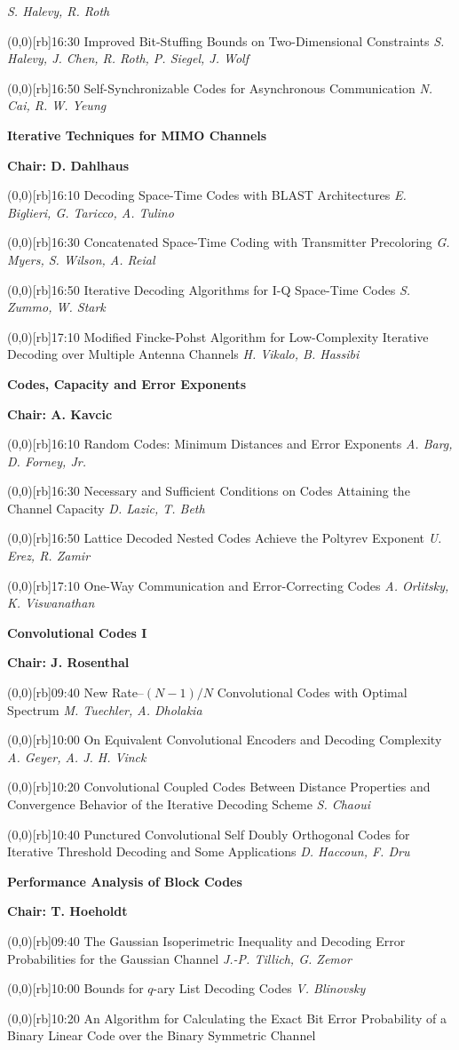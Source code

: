 \documentclass[a5paper,twoside]{article}
\def\period#1{\flushleft{\large\bfseries #1}\markboth{\sf #1}{\sf #1}}
\def\sesstitle#1{\vspace{.45\bigskipamount}\par{\bfseries #1}\par}
\def\sesschair#1{{\bfseries Chair: #1}\par\vspace{.65\medskipamount}}
\def\papertime#1{\makebox(0,0)[rb]{{\scriptsize #1}\hspace{.5em}}}
\def\papertitle#1{#1\hfil\break}
\def\paperauthors#1{{\itshape #1}\par\filbreak\vspace{.65\medskipamount}}
\begin{document}
\paperauthors{S. Halevy, R. Roth}
\papertime{16:30}%
\papertitle{Improved Bit-Stuffing Bounds on Two-Dimensional Constraints}
\paperauthors{S. Halevy, J. Chen, R. Roth, P. Siegel, J. Wolf}
\papertime{16:50}%
\papertitle{Self-Synchronizable Codes for Asynchronous Communication}
\paperauthors{N. Cai, R. W. Yeung}
\sesstitle{Iterative Techniques for MIMO Channels}
\sesschair{D. Dahlhaus}
\papertime{16:10}%
\papertitle{Decoding Space-Time Codes with BLAST Architectures}
\paperauthors{E. Biglieri, G. Taricco, A. Tulino}
\papertime{16:30}%
\papertitle{Concatenated Space-Time Coding with Transmitter Precoloring}
\paperauthors{G. Myers, S. Wilson, A. Reial}
\papertime{16:50}%
\papertitle{Iterative Decoding Algorithms for I-Q Space-Time Codes}
\paperauthors{S. Zummo, W. Stark}
\papertime{17:10}%
\papertitle{Modified Fincke-Pohst Algorithm for Low-Complexity Iterative Decoding over Multiple Antenna Channels}
\paperauthors{H. Vikalo, B. Hassibi}
\sesstitle{Codes, Capacity and Error Exponents}
\sesschair{A. Kavcic}
\papertime{16:10}%
\papertitle{Random Codes: Minimum Distances and Error Exponents}
\paperauthors{A. Barg, D. Forney, Jr.}
\papertime{16:30}%
\papertitle{Necessary and Sufficient Conditions on Codes Attaining the Channel Capacity}
\paperauthors{D. Lazic, T. Beth}
\papertime{16:50}%
\papertitle{Lattice Decoded Nested Codes Achieve the Poltyrev Exponent}
\paperauthors{U. Erez, R. Zamir}
\papertime{17:10}%
\papertitle{One-Way Communication and Error-Correcting Codes}
\paperauthors{A. Orlitsky, K. Viswanathan}
\period{Fri 09:40 -- 11:00}
\sesstitle{Convolutional Codes I}
\sesschair{J. Rosenthal}
\papertime{09:40}%
\papertitle{New Rate--$(N-1)/N$ Convolutional Codes with Optimal Spectrum}
\paperauthors{M. Tuechler, A. Dholakia}
\papertime{10:00}%
\papertitle{On Equivalent Convolutional Encoders and Decoding Complexity}
\paperauthors{A. Geyer, A. J. H. Vinck}
\papertime{10:20}%
\papertitle{Convolutional Coupled Codes Between Distance Properties and Convergence Behavior of the Iterative Decoding Scheme}
\paperauthors{S. Chaoui}
\papertime{10:40}%
\papertitle{Punctured Convolutional Self Doubly Orthogonal Codes for Iterative Threshold Decoding and Some Applications}
\paperauthors{D. Haccoun, F. Dru}
\sesstitle{Performance Analysis of Block Codes}
\sesschair{T. Hoeholdt}
\papertime{09:40}%
\papertitle{The Gaussian Isoperimetric Inequality and Decoding Error Probabilities for the Gaussian Channel}
\paperauthors{J.-P. Tillich, G. Zemor}
\papertime{10:00}%
\papertitle{Bounds for $q$-ary List Decoding Codes}
\paperauthors{V. Blinovsky}
\papertime{10:20}%
\papertitle{An Algorithm for Calculating the Exact Bit Error Probability of a Binary Linear Code over the Binary Symmetric Channel}
\end{document}
